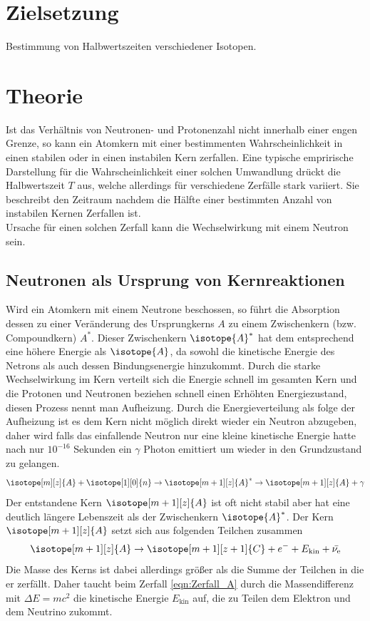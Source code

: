 \newpage
\section*{Zielsetzung}
Bestimmung von Halbwertszeiten verschiedener Isotopen.
\section{Theorie}
Ist das Verhältnis von Neutronen- und Protonenzahl nicht innerhalb einer engen Grenze, so kann ein Atomkern mit einer bestimmenten Wahrscheinlichkeit in einen stabilen oder in einen instabilen Kern zerfallen. 
Eine typische emprirische Darstellung für die Wahrscheinlichkeit einer solchen Umwandlung drückt die Halbwertszeit $T$ aus, welche allerdings für verschiedene Zerfälle stark variiert.
Sie beschreibt den Zeitraum nachdem die Hälfte einer bestimmten Anzahl von instabilen Kernen Zerfallen ist.\\
Ursache für einen solchen Zerfall kann die Wechselwirkung mit einem Neutron sein.
\subsection{Neutronen als Ursprung von Kernreaktionen}
Wird ein Atomkern mit einem Neutrone beschossen, so führt die Absorption dessen zu einer Veränderung des Ursprungkerns $A$ zu einem Zwischenkern (bzw. Compoundkern) $A^*$.
Dieser Zwischenkern $\isotope{A}^*$ hat dem entsprechend eine höhere Energie als $\isotope{A}$, da sowohl die kinetische Energie des Netrons als auch dessen Bindungsenergie hinzukommt.
Durch die starke Wechselwirkung im Kern verteilt sich die Energie schnell im gesamten Kern und die Protonen und Neutronen beziehen schnell einen Erhöhten Energiezustand, diesen Prozess nennt man Aufheizung.
Durch die Energieverteilung als folge der Aufheizung ist es dem Kern nicht möglich direkt wieder ein Neutron abzugeben, daher wird falls das einfallende Neutron nur eine kleine kinetische Energie hatte nach nur $10^{-16}$ Sekunden ein $\gamma$ Photon emittiert um wieder in den Grundzustand zu gelangen.
\begin{equation}
    \isotope[m][z]{A} + \isotope[1][0]{n} \to \isotope[m+1][z]{A}^{*} \to \isotope[m+1][z]{A} + \gamma \nonumber
\end{equation}
Der entstandene Kern $\isotope[m+1][z]{A}$ ist oft nicht stabil aber hat eine deutlich längere Lebenszeit als der Zwischenkern $\isotope{A}^*$.
Der Kern $\isotope[m+1][z]{A}$ setzt sich aus folgenden Teilchen zusammen
\begin{equation}
    \isotope[m+1][z]{A} \to \isotope[m+1][z+1]{C} + e^- + E_{\text{kin}} + \bar{\nu_{\text{e}}} \label{eqn:Zerfall_A}
\end{equation}
Die Masse des Kerns ist dabei allerdings größer als die Summe der Teilchen in die er zerfällt.
Daher taucht beim Zerfall \ref{eqn:Zerfall_A} durch die Massendifferenz mit $\Delta E = mc^2$ die kinetische Energie $E_{\text{kin}}$ auf, die zu Teilen dem Elektron und dem Neutrino zukommt.

